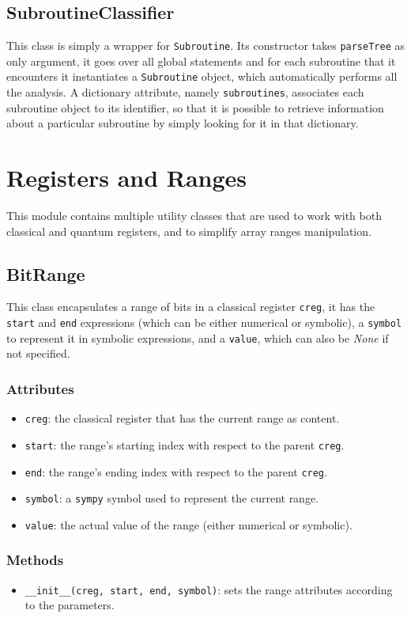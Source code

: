 \documentclass[12pt,a4paper]{report}
\theoremstyle{definition}
\theoremstyle{definition}
\theoremstyle{definition}
\begin{document}
\subsection{SubroutineClassifier}
This class is simply a wrapper for \texttt{Subroutine}. Its constructor takes \texttt{parseTree} as only argument, it goes over all global statements and for each subroutine that it encounters it instantiates a \texttt{Subroutine} object, which automatically performs all the analysis. A dictionary attribute, namely \texttt{subroutines}, associates each subroutine object to its identifier, so that it is possible to retrieve information about a particular subroutine by simply looking for it in that dictionary.

\section{Registers and Ranges}
This module contains multiple utility classes that are used to work with both classical and quantum registers, and to simplify array ranges manipulation.


\subsection{BitRange}
This class encapsulates a range of bits in a classical register \texttt{creg}, it has the \texttt{start} and \texttt{end} expressions (which can be either numerical or symbolic), a \texttt{symbol} to represent it in symbolic expressions, and a \texttt{value}, which can also be \textit{None} if not specified.
\subsubsection{Attributes}
\begin{itemize}
    \itemsep 0em
    \item \texttt{creg}: the classical register that has the current range as content.
    \item \texttt{start}: the range's starting index with respect to the parent \texttt{creg}.
    \item \texttt{end}: the range's ending index with respect to the parent \texttt{creg}.
    \item \texttt{symbol}: a \texttt{sympy} symbol used to represent the current range.
    \item \texttt{value}: the actual value of the range (either numerical or symbolic).
\end{itemize}
\subsubsection{Methods}
\begin{itemize}
    \itemsep 0em
    \item \texttt{\_\_init\_\_(creg, start, end, symbol)}: sets the range attributes according to the parameters.
\end{itemize}
\end{document}
